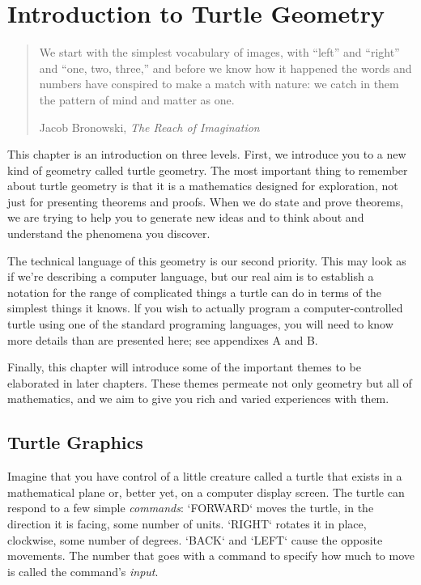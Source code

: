 \documentclass{book}
\begin{document}
\tableofcontents
\listoffigures

\chapter{Introduction to Turtle Geometry}
\begin{quote}We start with the simplest vocabulary of images, with ``left'' and ``right'' and ``one, two, three,'' and before we know how it happened the words and numbers have conspired to make a match with nature: we catch in them the pattern of mind and matter as one.

Jacob Bronowski, {\em The Reach of Imagination}\end{quote}

This chapter is an introduction on three levels. First, we introduce you to a new kind of geometry called turtle geometry. The most important thing to remember about turtle geometry is that it is a mathematics designed for exploration, not just for presenting theorems and proofs. When we do state and prove theorems, we are trying to help you to generate new ideas and to think about and understand the phenomena you discover.

The technical language of this geometry is our second priority. This may look as if we're describing a computer language, but our real aim is to establish a notation for the range of complicated things a turtle can do in terms of the simplest things it knows. lf you wish to actually program a computer-controlled turtle using one of the standard programing languages, you will need to know more details than are presented here; see appendixes A and B.

Finally, this chapter will introduce some of the important themes to be elaborated in later chapters. These themes permeate not only geometry but all of mathematics, and we aim to give you rich and varied experiences with them.

\section{Turtle Graphics}
Imagine that you have control of a little creature called a turtle that exists in a mathematical plane or, better yet, on a computer display screen. The turtle can respond to a few simple {\em commands}: \textsc{`FORWARD`} moves the turtle, in the direction it is facing, some number of units. \textsc{`RIGHT`} rotates it in place, clockwise, some number of degrees. \textsc{`BACK`} and \textsc{`LEFT`} cause the opposite movements. The number that goes with a command to specify how much to move is called the command's {\em input}.
\end{document}
